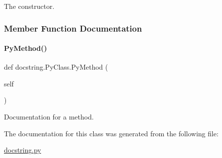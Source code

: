 \begin{DoxyVerb}The constructor.\end{DoxyVerb}
 

\subsubsection{Member Function Documentation}
\mbox{\label{classdocstring_1_1_py_class_af092e1eacc10334e0e8630531a3473b4}} 
\paragraph{\texorpdfstring{Py\+Method()}{PyMethod()}}
{\footnotesize\ttfamily def docstring.\+Py\+Class.\+Py\+Method (\begin{DoxyParamCaption}\item[{}]{self }\end{DoxyParamCaption})}

\begin{DoxyVerb}Documentation for a method.\end{DoxyVerb}
 

The documentation for this class was generated from the following file\+:\begin{DoxyCompactItemize}
\item 
\hyperlink{docstring_8py}{docstring.\+py}\end{DoxyCompactItemize}
